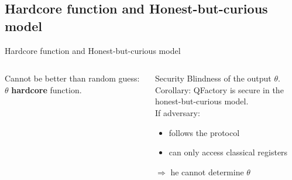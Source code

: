 \documentclass[]{beamer}
\begin{document}


\subsection{Hardcore function and Honest-but-curious model}
\begin{frame}[t]{Hardcore function and Honest-but-curious model}
  \begin{columns}
    \begin{column}{.5\textwidth}
    \begin{figure}[ht]
      \centering
    \end{figure}
    Cannot be better than random guess: $\theta$ \textbf{hardcore} function.
  \end{column}%
  \begin{column}{.5\textwidth}
    \begin{exampleblock}{Security}
     Blindness of the output $\theta$. \\
      Corollary: QFactory is secure in the
      honest-but-curious model.\\
      If adversary:
      \begin{itemize}
      \item follows the protocol
      \item can only access classical registers
      \end{itemize}
      $\Rightarrow $ he cannot determine $\theta$
    \end{exampleblock}
  \end{column}
\end{columns}
\end{frame}
\end{document}
